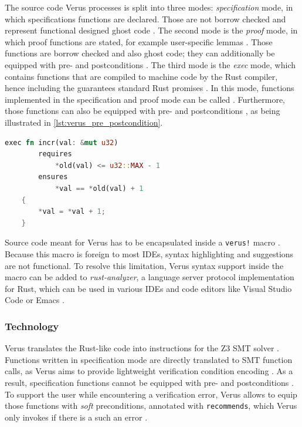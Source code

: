 The source code Verus processes is split into three modes: \textit{specification} mode, in which specifications functions are declared. Those are not borrow checked and represent functional designed ghost code \cite{lattuadaVerusVerifyingRust2023}. The second mode is the \textit{proof} mode, in which proof functions are stated, for example user-specific lemmas \cite{lattuadaVerusVerifyingRust2023}. Those functions are borrow checked and also ghost code; they can additionally be equipped with pre- and postconditions \cite{lattuadaVerusVerifyingRust2023}. The third mode is the \textit{exec} mode, which contains functions that are compiled to machine code by the Rust compiler, hence including the guarantees standard Rust promises \cite{lattuadaVerusVerifyingRust2023}. In this mode, functions implemented in the specification and proof mode can be called \cite{lattuadaVerusVerifyingRust2023}. Furthermore, those functions can also be equipped with pre- and postconditions \cite{lattuadaVerusVerifyingRust2023}, as being illustrated in \autoref{lst:verus_pre_postcondition}.

\begin{lstlisting}[float, language=Rust, caption=Example Rust code of an increase function with a pre- and postcondition for Verus, label={lst:verus_pre_postcondition}]
    exec fn incr(val: &mut u32)
        requires
            *old(val) <= u32::MAX - 1
        ensures
            *val == *old(val) + 1
    {
        *val = *val + 1;
    }
\end{lstlisting}

Source code meant for Verus has to be encapsulated inside a \lstinline{verus!} macro \cite{verus-lang_getting_2023}. Because this macro is foreign to most IDEs, syntax highlighting and suggestions are not functional. To resolve this limitation, Verus syntax support inside the macro can be added \cite{verus-lang_getting_2023} to \textit{rust-analyzer}, a language server protocol implementation for Rust, which can be used in various IDEs and code editors like Visual Studio Code or Emacs \cite{rust_analyzer_user_2023}.

\subsubsection{Technology}
Verus translates the Rust-like code into instructions for the Z3 SMT solver \cite{lattuadaVerusVerifyingRust2023}. Functions written in specification mode are directly translated to SMT function calls, as Verus aims to provide lightweight verification condition encoding \cite{lattuadaVerusVerifyingRust2023}. As a result, specification functions cannot be equipped with pre- and postconditions \cite{lattuadaVerusVerifyingRust2023}. To support the user while encountering a verification error, Verus allows to equip those functions with \textit{soft} preconditions, annotated with \lstinline{recommends}, which Verus only invokes if there is a such an error \cite{lattuadaVerusVerifyingRust2023}. 

